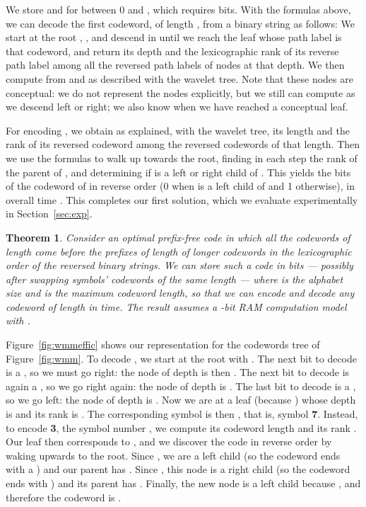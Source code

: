 \documentclass[preprint,12pt]{elsarticle}
\newtheorem{theorem}{Theorem}
\begin{document}
We store  and  for  between 0 and , which 
requires  bits. With the formulas above, we can decode the
first codeword, of length , from a binary string as follows:
We start at the root , , and descend in  until we reach the leaf 
 whose path
label is that codeword, and return its depth  and the lexicographic rank 
 of its reverse path label among all the reversed path labels of nodes 
at that depth. We then compute  from  and  as described with the
wavelet tree. Note that these nodes  are
conceptual: we do not represent the nodes explicitly, but we still can compute
 as we descend left or right; we also know when we have reached a 
conceptual leaf. 

For encoding , we obtain as explained, with the wavelet tree, its length 
 and the rank  of its reversed codeword among the reversed
codewords of that length. Then we use the formulas to walk up towards the
root, finding in each step the rank  of the parent  of , and
determining if  is a left or right child of . This yields the 
bits of the codeword of  in reverse order (0 when  is a left child of
 and 1 otherwise), in overall time . This completes our first
solution, which we evaluate experimentally in Section~\ref{sec:exp}.

\begin{theorem}
\label{thm:matrices0}
Consider an optimal prefix-free code in which all the codewords of length 
 come before the prefixes of length  of longer codewords in the 
lexicographic order of the reversed binary strings.
We can store such a code in  bits --- possibly after swapping symbols' codewords of the same length --- where  is the alphabet size and  is the maximum codeword length, so that we can encode and decode any codeword of length  in 
 time.
The result assumes a -bit RAM computation model with .
\end{theorem}

Figure~\ref{fig:wmmeffic} shows our representation for the codewords tree of
Figure~\ref{fig:wmm}. To decode , we start at the root with .
The next bit to decode is a , so we must go right: the node of depth  is
then . The next bit to decode is again
a , so we go right again: the node of depth  is . The last bit to decode is a , so we go left: the node of
depth  is . Now we are at a leaf (because
) whose depth is  and its rank is . The 
corresponding symbol is then , that is, symbol {\bf 7}. 
Instead, to encode {\bf 3}, the symbol number , we compute its codeword 
length  and its rank . Our leaf then corresponds 
to , and we discover the code in reverse order by waking upwards to the 
root. Since , we are a left child (so the codeword ends
with a ) and our parent has . Since , this node is a right child (so the codeword ends with )
and its parent has . Finally, the new
node is a left child because , and therefore the
codeword is .
\end{document}
